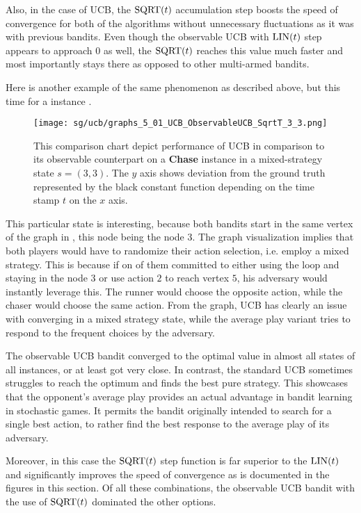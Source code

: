 \documentclass[../main.tex]{subfiles}
\begin{document}
Also, in the case of UCB, the $\text{SQRT}(t)$ accumulation step boosts the speed of convergence for both of the algorithms without unnecessary fluctuations as it was with previous bandits.
Even though the observable UCB with $\text{LIN}(t)$ step appears to approach 0 as well, the $\text{SQRT}(t)$ reaches this value much faster and most importantly stays there as opposed to other multi-armed bandits.

Here is another example of the same phenomenon as described above, but this time for a  instance .
\begin{figure}[ht]
    \texttt{[image: sg/ucb/graphs\_5\_01\_UCB\_ObservableUCB\_SqrtT\_3\_3.png]}
    \caption[Comparison of observable and unobservable UCB on a  instance]{
        This comparison chart depict performance of UCB in comparison to its observable counterpart on a \textbf{Chase} instance  in a mixed-strategy state $s = \left(3, 3\right)$.
        The $y$ axis shows deviation from the ground truth represented by the black constant function depending on the time stamp $t$ on the $x$ axis.
    }
    \label{exp:sg:ucb:fig:unconvergence}
\end{figure}
This particular state is interesting, because both bandits start in the same vertex of the graph in , this node being the node $3$.
The graph visualization implies that both players would have to randomize their action selection, i.e. employ a mixed strategy.
This is because if on of them committed to either using the loop and staying in the node $3$ or use action $2$ to reach vertex $5$, his adversary would instantly leverage this.
The runner would choose the opposite action, while the chaser would choose the same action.
From the graph, UCB has clearly an issue with converging in a mixed strategy state, while the average play variant tries to respond to the frequent choices by the adversary.

The observable UCB bandit converged to the optimal value in almost all states of all instances, or at least got very close.
In contrast, the standard UCB sometimes struggles to reach the optimum and finds the best pure strategy.
This showcases that the opponent's average play provides an actual advantage in bandit learning in stochastic games.
It permits the bandit originally intended to search for a single best action, to rather find the best response to the average play of its adversary.

Moreover, in this case the $\text{SQRT}(t)$ step function is far superior to the $\text{LIN}(t)$ and significantly improves the speed of convergence as is documented in the figures in this section.
Of all these combinations, the observable UCB bandit with the use of $\text{SQRT}(t)$ dominated the other options.
\end{document}
